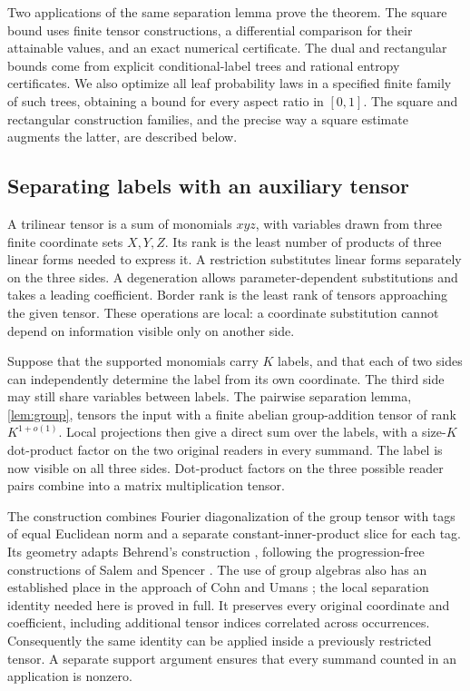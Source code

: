 \documentclass[11pt]{article}
\numberwithin{equation}{section}
\theoremstyle{definition}
\theoremstyle{remark}
\begin{document}
Two applications of the same separation lemma prove the theorem.
The square bound uses finite tensor constructions, a differential
comparison for their attainable values, and an exact numerical
certificate.  The dual and rectangular bounds come from explicit
conditional-label trees and rational entropy certificates.
We also optimize all leaf probability laws in a specified finite
family of such trees, obtaining a bound for every aspect ratio in
\([0,1]\).  The square and rectangular construction families, and
the precise way a square estimate augments the latter, are described
below.

\subsection{Separating labels with an auxiliary tensor}

A trilinear tensor is a sum of monomials \(xyz\), with variables
drawn from three finite coordinate sets \(X,Y,Z\).  Its rank is the
least number of products of three linear forms needed to express it.
A restriction substitutes linear forms separately on the three
sides.  A degeneration allows parameter-dependent substitutions and
takes a leading coefficient.  Border rank is the least rank of
tensors approaching the given tensor.  These operations are local: a
coordinate substitution cannot depend on information visible only
on another side.

Suppose that the supported monomials carry \(K\) labels, and that
each of two sides can independently determine the label from its own
coordinate.  The third side may still share variables between labels.
The pairwise separation lemma, \cref{lem:group}, tensors the input
with a finite abelian group-addition tensor of rank \(K^{1+o(1)}\).
Local projections then give a direct sum over the labels, with a
size-\(K\) dot-product factor on the two original readers in every
summand.  The label is now visible on all three sides.  Dot-product
factors on the three possible reader pairs combine into a matrix
multiplication tensor.

The construction combines Fourier diagonalization of the group tensor
with tags of equal Euclidean norm and a separate constant-inner-product
slice for each tag.  Its geometry adapts Behrend's construction
\cite{behrend}, following the progression-free constructions of Salem
and Spencer \cite{salem-spencer}.  The use of group algebras also has
an established place in the approach of Cohn and Umans
\cite{cohn-umans}; the local separation identity needed here is proved
in full.  It preserves every original coordinate and coefficient,
including additional tensor indices correlated across occurrences.
Consequently the same identity can be applied inside a previously
restricted tensor.  A separate support argument ensures that every
summand counted in an application is nonzero.
\end{document}
